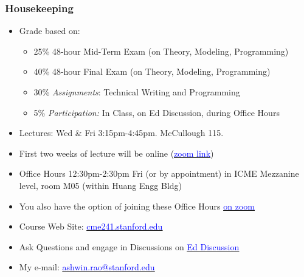 \documentclass[handout]{beamer}
\begin{document}
\begin{frame}
\frametitle{Housekeeping}
\pause
\begin{itemize}[<+->]
\item Grade based on:
\begin{itemize}
\item 25\% 48-hour Mid-Term Exam (on Theory, Modeling, Programming)
\item 40\% 48-hour Final Exam (on Theory, Modeling, Programming)
\item 30\% {\em Assignments}: Technical Writing and Programming
\item 5\% {\em Participation:} In Class, on Ed Discussion, during Office Hours
\end{itemize}
\item Lectures: Wed \& Fri 3:15pm-4:45pm. McCullough 115.
\item First two weeks of lecture will be online (\href{https://stanford.zoom.us/j/96275989341?pwd=ZDJ6aTUzelNiRW9ZQkVHZ1BheEZCZz09}{\underline{\textcolor{blue}{zoom link}}})
\item Office Hours 12:30pm-2:30pm Fri (or by appointment) in ICME Mezzanine level, room M05 (within Huang Engg Bldg)
\item You also have the option of joining these Office Hours \href{https://stanford.zoom.us/j/92139204563?pwd=cFgxTjhiQTlpQzAzRks5RDRDcGYydz09}{\underline{\textcolor{blue}{on zoom}}}
\item Course Web Site: \href{http://cme241.stanford.edu}{\underline{\textcolor{blue}{cme241.stanford.edu}}}
\item Ask Questions and engage in Discussions on \href{https://edstem.org/us/courses/16175}{\underline{\textcolor{blue}{Ed Discussion}}}
\item My e-mail: \href{mailto:ashwin.rao@stanford.edu}{\underline{\textcolor{blue}{ashwin.rao@stanford.edu}}}
\end{itemize}
\end{frame}
\end{document}
